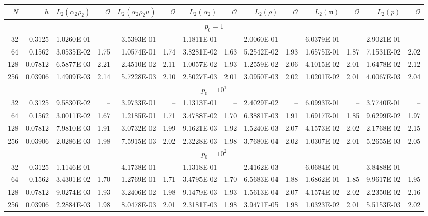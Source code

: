 \begin{tabular}{rrrrrrrrrrrrrr}
\hline
$N$ & $h$ & $L_2(\alpha_2\rho_2)$ & $\mathcal{O}$ & $L_2(\alpha_2\rho_2u)$ & $\mathcal{O}$ & $L_2(\alpha_2)$ & $\mathcal{O}$ & $L_2(\rho)$ & $\mathcal{O}$ & $L_2(\mathbf{u})$ & $\mathcal{O}$ & $L_2(p)$ & $\mathcal{O}$ \\
\hline
\multicolumn{14}{c}{$p_0=1$} \\
32 & 0.3125 & 1.0260E-01 & -- & 3.5393E-01 & -- & 1.1811E-01 & -- & 2.0060E-01 & -- & 6.0379E-01 & -- & 2.9021E-01 & -- \\
64 & 0.1562 & 3.0535E-02 & 1.75 & 1.0574E-01 & 1.74 & 3.8281E-02 & 1.63 & 5.2542E-02 & 1.93 & 1.6575E-01 & 1.87 & 7.1531E-02 & 2.02 \\
128 & 0.07812 & 6.5877E-03 & 2.21 & 2.4510E-02 & 2.11 & 1.0057E-02 & 1.93 & 1.2559E-02 & 2.06 & 4.1015E-02 & 2.01 & 1.6478E-02 & 2.12 \\
256 & 0.03906 & 1.4909E-03 & 2.14 & 5.7228E-03 & 2.10 & 2.5027E-03 & 2.01 & 3.0950E-03 & 2.02 & 1.0201E-02 & 2.01 & 4.0067E-03 & 2.04 \\
\multicolumn{14}{c}{$p_0=10^{1}$} \\
32 & 0.3125 & 9.5830E-02 & -- & 3.9733E-01 & -- & 1.1313E-01 & -- & 2.4029E-02 & -- & 6.0993E-01 & -- & 3.7740E-01 & -- \\
64 & 0.1562 & 3.0011E-02 & 1.67 & 1.2185E-01 & 1.71 & 3.4788E-02 & 1.70 & 6.3881E-03 & 1.91 & 1.6917E-01 & 1.85 & 9.6299E-02 & 1.97 \\
128 & 0.07812 & 7.9810E-03 & 1.91 & 3.0732E-02 & 1.99 & 9.1621E-03 & 1.92 & 1.5240E-03 & 2.07 & 4.1573E-02 & 2.02 & 2.1768E-02 & 2.15 \\
256 & 0.03906 & 2.0286E-03 & 1.98 & 7.5915E-03 & 2.02 & 2.3228E-03 & 1.98 & 3.7680E-04 & 2.02 & 1.0307E-02 & 2.01 & 5.2655E-03 & 2.05 \\
\multicolumn{14}{c}{$p_0=10^{2}$} \\
32 & 0.3125 & 1.1146E-01 & -- & 4.1738E-01 & -- & 1.1318E-01 & -- & 2.4162E-03 & -- & 6.0684E-01 & -- & 3.8488E-01 & -- \\
64 & 0.1562 & 3.4301E-02 & 1.70 & 1.2769E-01 & 1.71 & 3.4795E-02 & 1.70 & 6.5683E-04 & 1.88 & 1.6862E-01 & 1.85 & 9.9617E-02 & 1.95 \\
128 & 0.07812 & 9.0274E-03 & 1.93 & 3.2406E-02 & 1.98 & 9.1479E-03 & 1.93 & 1.5613E-04 & 2.07 & 4.1574E-02 & 2.02 & 2.2350E-02 & 2.16 \\
256 & 0.03906 & 2.2884E-03 & 1.98 & 8.0478E-03 & 2.01 & 2.3181E-03 & 1.98 & 3.9471E-05 & 1.98 & 1.0323E-02 & 2.01 & 5.5153E-03 & 2.02 \\

\end{tabular}

